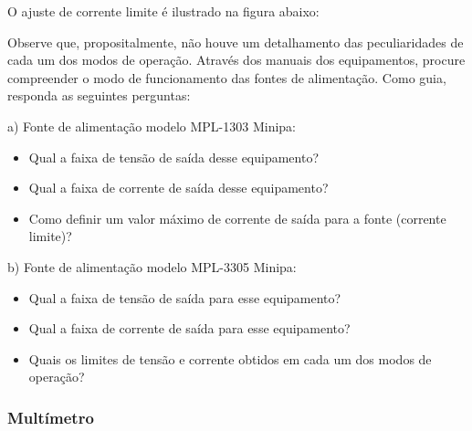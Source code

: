 O ajuste de corrente limite é ilustrado na figura abaixo:


Observe que, propositalmente, não houve um detalhamento das peculiaridades de cada um dos modos de operação. Através dos manuais dos equipamentos, procure compreender o modo de funcionamento das fontes de alimentação. Como guia, responda as seguintes perguntas:

a) Fonte de alimentação modelo MPL-1303 Minipa:

\begin{itemize}
    \item Qual a faixa de tensão de saída desse equipamento?
    \item Qual a faixa de corrente de saída desse equipamento?
    \item Como definir um valor máximo de corrente de saída para a fonte (corrente limite)?
\end{itemize}

\vspace{.5em}

b) Fonte de alimentação modelo MPL-3305 Minipa:

\begin{itemize}
    \item Qual a faixa de tensão de saída para esse equipamento?
    \item Qual a faixa de corrente de saída para esse equipamento?
    \item Quais os limites de tensão e corrente obtidos em cada um dos modos de operação?
\end{itemize}

\subsubsection{Multímetro}

